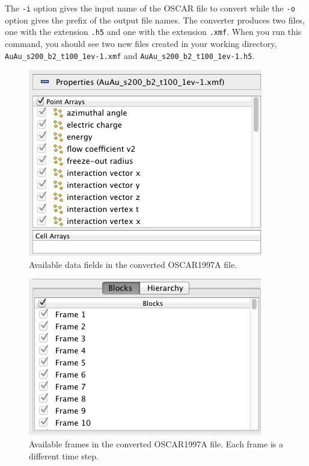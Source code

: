 \documentclass[12pt]{article}
\newcommand{\file}[1]{\texttt{#1}}
\begin{document}
The \texttt{-i} option gives the input name of the OSCAR file to convert while the \texttt{-o} option gives the prefix of the output file names. The converter produces two files, one with the extension \file{.h5} and one with the extension \file{.xmf}. When you run this command, you should see two new files created in your working directory, \file{AuAu\_s200\_b2\_t100\_1ev-1.xmf} and \file{AuAu\_s200\_b2\_t100\_1ev-1.h5}.

\begin{figure}[htbp]
   \centering
   \includegraphics[scale=.5]{images/OSCAR1997A_PointArrays.png} %
   \caption{Available data fields  in the converted OSCAR1997A file.}
   \label{fig:OSCAR1997A_PointArrays}
\end{figure}

\begin{figure}[htbp]
   \centering
   \includegraphics[scale=.5]{images/OSCAR1997A_Blocks.png} %
   \caption{Available frames  in the converted OSCAR1997A file. Each frame is a different time step.}
   \label{fig:OSCAR1997A_Blocks}
\end{figure}
\end{document}
